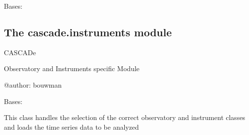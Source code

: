 \documentclass[a4paper,11pt,english]{sphinxmanual}
\begin{document}
\begin{fulllineitems}
\label{\detokenize{cascade.initialize:cascade.initialize.initialize.configurator}}
Bases: 

\begin{fulllineitems}
\label{\detokenize{cascade.initialize:cascade.initialize.initialize.configurator.isInitialized}}
\end{fulllineitems}


\begin{fulllineitems}
\label{\detokenize{cascade.initialize:cascade.initialize.initialize.configurator.reset}}
\end{fulllineitems}


\end{fulllineitems}



\subsection{The cascade.instruments module}
\label{\detokenize{cascade.instruments:module-cascade.instruments.instruments}}\label{\detokenize{cascade.instruments:the-cascade-instruments-module}}\label{\detokenize{cascade.instruments::doc}}
CASCADe

Observatory and Instruments specific Module

@author: bouwman

\begin{fulllineitems}
\label{\detokenize{cascade.instruments:cascade.instruments.instruments.Observation}}
Bases: 

This class handles the selection of the correct observatory and
instrument classes and loads the time series data to be analyzed

\end{fulllineitems}
\end{document}

